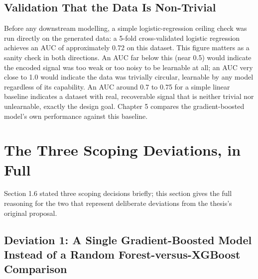 \documentclass[12pt,oneside]{report}
\begin{document}
\hypertarget{validation-that-the-data-is-non-trivial}{%
\subsection{Validation That the Data Is
Non-Trivial}\label{validation-that-the-data-is-non-trivial}}

Before any downstream modelling, a simple logistic-regression ceiling
check was run directly on the generated data: a 5-fold cross-validated
logistic regression achieves an AUC of approximately 0.72 on this
dataset. This figure matters as a sanity check in both directions. An
AUC far below this (near 0.5) would indicate the encoded signal was too
weak or too noisy to be learnable at all; an AUC very close to 1.0 would
indicate the data was trivially circular, learnable by any model
regardless of its capability. An AUC around 0.7 to 0.75 for a simple
linear baseline indicates a dataset with real, recoverable signal that
is neither trivial nor unlearnable, exactly the design goal. Chapter 5
compares the gradient-boosted model's own performance against this
baseline.

\hypertarget{the-three-scoping-deviations-in-full}{%
\section{The Three Scoping Deviations, in
Full}\label{the-three-scoping-deviations-in-full}}

Section 1.6 stated three scoping decisions briefly; this section gives
the full reasoning for the two that represent deliberate deviations from
the thesis's original proposal.

\hypertarget{deviation-1-a-single-gradient-boosted-model-instead-of-a-random-forest-versus-xgboost-comparison}{%
\subsection{Deviation 1: A Single Gradient-Boosted Model Instead of a
Random Forest-versus-XGBoost
Comparison}\label{deviation-1-a-single-gradient-boosted-model-instead-of-a-random-forest-versus-xgboost-comparison}}
\end{document}
